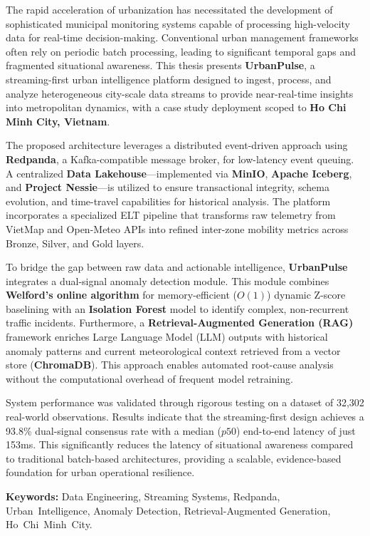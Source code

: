 \documentclass[12pt, twoside]{report}
\begin{document}
The rapid acceleration of urbanization has necessitated the development of sophisticated municipal monitoring systems capable of processing high-velocity data for real-time decision-making. Conventional urban management frameworks often rely on periodic batch processing, leading to significant temporal gaps and fragmented situational awareness. This thesis presents \textbf{UrbanPulse}, a streaming-first urban intelligence platform designed to ingest, process, and analyze heterogeneous city-scale data streams to provide near-real-time insights into metropolitan dynamics, with a case study deployment scoped to \textbf{Ho Chi Minh City, Vietnam}.

The proposed architecture leverages a distributed event-driven approach using \textbf{Redpanda}, a Kafka-compatible message broker, for low-latency event queuing. A centralized \textbf{Data Lakehouse}---implemented via \textbf{MinIO}, \textbf{Apache Iceberg}, and \textbf{Project Nessie}---is utilized to ensure transactional integrity, schema evolution, and time-travel capabilities for historical analysis. The platform incorporates a specialized ELT pipeline that transforms raw telemetry from VietMap and Open-Meteo APIs into refined inter-zone mobility metrics across Bronze, Silver, and Gold layers.

To bridge the gap between raw data and actionable intelligence, \textbf{UrbanPulse} integrates a dual-signal anomaly detection module. This module combines \textbf{Welford's online algorithm} for memory-efficient ($O(1)$) dynamic Z-score baselining with an \textbf{Isolation Forest} model to identify complex, non-recurrent traffic incidents. Furthermore, a \textbf{Retrieval-Augmented Generation (RAG)} framework enriches Large Language Model (LLM) outputs with historical anomaly patterns and current meteorological context retrieved from a vector store (\textbf{ChromaDB}). This approach enables automated root-cause analysis without the computational overhead of frequent model retraining.

System performance was validated through rigorous testing on a dataset of 32,302 real-world observations. Results indicate that the streaming-first design achieves a 93.8\% dual-signal consensus rate with a median ($p50$) end-to-end latency of just 153ms. This significantly reduces the latency of situational awareness compared to traditional batch-based architectures, providing a scalable, evidence-based foundation for urban operational resilience.


\vspace{2cm}
\noindent \textbf{Keywords:} Data Engineering, Streaming Systems, Redpanda, Urban~Intelligence, Anomaly Detection, Retrieval-Augmented Generation, Ho~Chi~Minh~City.
\end{document}
